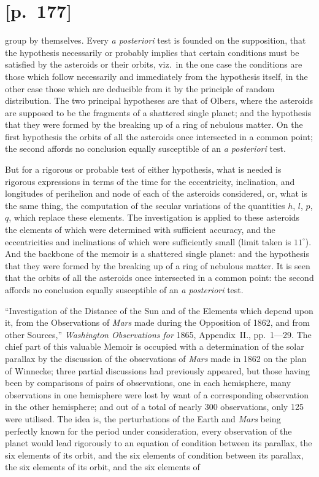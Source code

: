 \documentclass[11pt]{article}
\begin{document}
\section*{[p.~177]}
group by themselves. Every \textit{a posteriori} test is founded on the supposition, that the
hypothesis necessarily or probably implies that certain conditions must be satisfied by
the asteroids or their orbits, viz.\ in the one case the conditions are those which follow
necessarily and immediately from the hypothesis itself, in the other case those which
are deducible from it by the principle of random distribution. The two principal
hypotheses are that of Olbers, where the asteroids are supposed to be the fragments
of a shattered single planet; and the hypothesis that they were formed by the breaking
up of a ring of nebulous matter. On the first hypothesis the orbits of all the
asteroids once intersected in a common point; the second affords no conclusion equally
susceptible of an \textit{a posteriori} test.

But for a rigorous or probable test of either hypothesis, what is needed is rigorous
expressions in terms of the time for the eccentricity, inclination, and longitudes of
perihelion and node of each of the asteroids considered, or, what is the same thing,
the computation of the secular variations of the quantities $h$, $l$, $p$, $q$, which replace
these elements. The investigation is applied to these asteroids the elements of which
were determined with sufficient accuracy, and the eccentricities and inclinations of
which were sufficiently small (limit taken is $11^\circ$). And the backbone of the memoir
is a shattered single planet: and the hypothesis that they were formed by the breaking
up of a ring of nebulous matter. It is seen that the orbits of all the
asteroids once intersected in a common point: the second affords no conclusion equally
susceptible of an \textit{a posteriori} test.

\medskip
\noindent``Investigation of the Distance of the Sun and of the Elements which depend
upon it, from the Observations of \textit{Mars} made during the Opposition of 1862, and
from other Sources,'' \textit{Washington Observations for} 1865, Appendix~II., pp.~1---29. The
chief part of this valuable Memoir is occupied with a determination of the solar
parallax by the discussion of the observations of \textit{Mars} made in 1862 on the plan of
Winnecke; three partial discussions had previously appeared, but those having been by
comparisons of pairs of observations, one in each hemisphere, many observations in one
hemisphere were lost by want of a corresponding observation in the other hemisphere;
and out of a total of nearly 300 observations, only 125 were utilised. The idea is,
the perturbations of the Earth and \textit{Mars} being perfectly known for the period under
consideration, every observation of the planet would lead rigorously to an equation of
condition between its parallax, the six elements of its orbit, and the six elements of
condition between its parallax, the six elements of its orbit, and the six elements of
\end{document}
